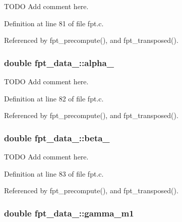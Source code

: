 T\-O\-D\-O Add comment here. 



Definition at line 81 of file fpt.\-c.



Referenced by fpt\-\_\-precompute(), and fpt\-\_\-transposed().

\hypertarget{structfpt__data___ae7491902143322ce74a8cccfa5ec7b3e}{
\subsubsection[{alpha\-\_\-0}]{\setlength{\rightskip}{0pt plus 5cm}double fpt\-\_\-data\-\_\-\-::alpha\-\_}}\label{structfpt__data___ae7491902143322ce74a8cccfa5ec7b3e}


T\-O\-D\-O Add comment here. 



Definition at line 82 of file fpt.\-c.



Referenced by fpt\-\_\-precompute(), and fpt\-\_\-transposed().

\hypertarget{structfpt__data___a4639c4494938cad8b0536191ca2eefaa}{
\subsubsection[{beta\-\_\-0}]{\setlength{\rightskip}{0pt plus 5cm}double fpt\-\_\-data\-\_\-\-::beta\-\_}}\label{structfpt__data___a4639c4494938cad8b0536191ca2eefaa}


T\-O\-D\-O Add comment here. 



Definition at line 83 of file fpt.\-c.



Referenced by fpt\-\_\-precompute(), and fpt\-\_\-transposed().

\hypertarget{structfpt__data___aa8dd07acd6d154b929423231b4b2847a}{
\subsubsection[{gamma\-\_\-m1}]{\setlength{\rightskip}{0pt plus 5cm}double fpt\-\_\-data\-\_\-\-::gamma\-\_\-m1}}\label{structfpt__data___aa8dd07acd6d154b929423231b4b2847a}


